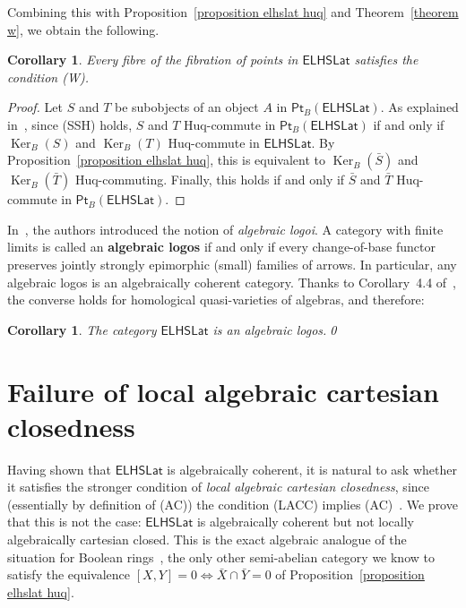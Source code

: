 \documentclass[reqno,a4paper]{amsart}
\newtheorem{corollary}[lemma]{Corollary}
\theoremstyle{remark}
\theoremstyle{definition}
\newcommand{\defn}{\textbf}
\newcommand{\noproof}{\hfill \qed}
\newcommand{\LACC}{{\rm (LACC)}}
\newcommand{\SSH}{{\rm (SSH)}}
\newcommand{\W}{{\rm (W)}}
\newcommand{\AC}{{\rm (AC)}}
\newcommand{\omeet}{\cap} %
\DeclareMathOperator{\Ker}{Ker}
\newcommand{\ELHSLat}{\ensuremath{\mathsf{ELHSLat}}}
\newcommand{\Pt}{\ensuremath{\mathsf{Pt}}}
\begin{document}
Combining this with Proposition~\ref{proposition elhslat huq} and Theorem~\ref{theorem w}, we obtain the following.

\begin{corollary}
	Every fibre of the fibration of points in \(\ELHSLat\) satisfies the condition \W{}.
\end{corollary}

\begin{proof}
	Let \(S\) and \(T\) be subobjects of an object \(A\) in \(\Pt_B(\ELHSLat)\). As explained in~\cite{MFVdL3}, since \SSH{} holds, \(S\) and \(T\) Huq-commute in \(\Pt_B(\ELHSLat)\) if and only if \(\Ker_B(S)\) and \(\Ker_B(T)\) Huq-commute in \(\ELHSLat\). By Proposition~\ref{proposition elhslat huq}, this is equivalent to \(\Ker_B(\bar S)\) and \(\Ker_B(\bar T)\) Huq-commuting.	Finally, this holds if and only if \(\bar S\) and \(\bar T\) Huq-commute in \(\Pt_B(\ELHSLat)\).
\end{proof}


In~\cite{AlgebraicLogoi}, the authors introduced the notion of \emph{algebraic logoi}. A category with finite limits is called an \defn{algebraic logos} if and only if every change-of-base functor preserves jointly strongly epimorphic (small) families of arrows. In particular, any algebraic logos is an algebraically coherent category. Thanks to Corollary~4.4 of~\cite{AlgebraicLogoi}, the converse holds for homological quasi-varieties of algebras, and therefore:

\begin{corollary}
	The category \(\ELHSLat\) is an algebraic logos.\noproof
\end{corollary}



\section{Failure of local algebraic cartesian closedness}\label{section lacc}

Having shown that \(\ELHSLat\) is algebraically coherent, it is natural to ask whether it satisfies the stronger condition of \emph{local algebraic cartesian closedness}, since (essentially by definition of \AC{}) the condition \LACC{} implies \AC{}~\cite{Bourn-Gray,acc}. We prove that this is not the case: \(\ELHSLat\) is algebraically coherent but not locally algebraically cartesian closed. This is the exact algebraic analogue of the situation for Boolean rings~\cite{Gray2012}, the only other semi-abelian category we know to satisfy the equivalence \([X,Y]=0 \Leftrightarrow \bar X \omeet \bar Y = 0\) of Proposition~\ref{proposition elhslat huq}.
\end{document}
